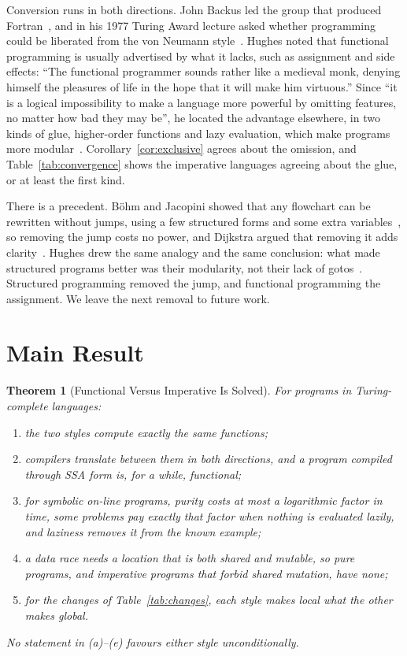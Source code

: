 \documentclass[11pt]{article}
\let\oldsection\section
\renewcommand{\section}{\Needspace{0.25\textheight}\oldsection}
\newtheorem{theorem}{Theorem}[section]
\theoremstyle{definition}
\theoremstyle{remark}
\begin{document}
Conversion runs in both directions. John Backus led the group that
produced Fortran~\cite{fortran}, and in his 1977 Turing Award lecture
asked whether programming could be liberated from the von Neumann
style~\cite{backus}. Hughes noted that functional programming is usually
advertised by what it lacks, such as assignment and side effects: ``The
functional programmer sounds rather like a medieval monk, denying himself
the pleasures of life in the hope that it will make him virtuous.'' Since
``it is a logical impossibility to make a language more powerful by
omitting features, no matter how bad they may be'', he located the
advantage elsewhere, in two kinds of glue, higher-order functions and
lazy evaluation, which make programs more modular~\cite{hughes}.
Corollary~\ref{cor:exclusive} agrees about the omission, and
Table~\ref{tab:convergence} shows the imperative languages agreeing
about the glue, or at least the first kind.

There is a precedent. Böhm and Jacopini showed that any flowchart can be
rewritten without jumps, using a few structured forms and some extra
variables~\cite{bohm}, so removing the jump costs no power, and Dijkstra
argued that removing it adds clarity~\cite{dijkstra}. Hughes drew the
same analogy and the same conclusion: what made structured programs
better was their modularity, not their lack of gotos~\cite{hughes}.
Structured programming removed the jump, and functional programming the
assignment. We leave the next removal to future work.

\section{Main Result}\label{sec:main}

\begin{theorem}[Functional Versus Imperative Is Solved]\label{thm:main}
  For programs in Turing-complete languages:
  \renewcommand{\labelenumi}{(\alph{enumi})}
  \begin{enumerate}
    \item the two styles compute exactly the same functions;
    \item compilers translate between them in both directions, and a
      program compiled through SSA form is, for a while, functional;
    \item for symbolic on-line programs, purity costs at most a
      logarithmic factor in time, some problems pay exactly that factor
      when nothing is evaluated lazily, and laziness removes it from the
      known example;
    \item a data race needs a location that is both shared and mutable,
      so pure programs, and imperative programs that forbid shared
      mutation, have none;
    \item for the changes of Table~\ref{tab:changes}, each style makes
      local what the other makes global.
  \end{enumerate}
  No statement in (a)--(e) favours either style unconditionally.
\end{theorem}
\end{document}

